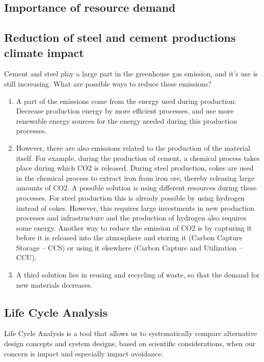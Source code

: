 \documentclass[../summary.tex]{subfiles}
\begin{document}
	\subsection{Importance of resource demand}
	
	
	
	\subsection{Reduction of steel and cement productions climate impact}
	
	Cement and steel play a large part in the greenhouse gas emission, and it’s use is still increasing. What are possible ways to reduce these emissions?
	
	\begin{enumerate}
		\item A part of the emissions come from the energy used during production: Decrease production energy by more efficient processes, and use more renewable energy sources for the energy needed during this production processes. 
		\item However, there are also emissions related to the production of the material itself. For example, during the production of cement, a chemical process takes place during which CO2 is released. During steel production, cokes are used in the chemical process to extract iron from iron ore, thereby releasing large amounts of CO2. A possible solution is using different resources during these processes. For steel production this is already possible by using hydrogen instead of cokes. However, this requires large investments in new production processes and infrastructure and the production of hydrogen also requires some energy. Another way to reduce the emission of CO2 is by capturing it before it is released into the atmosphere and storing it (Carbon Capture Storage – CCS) or using it elsewhere (Carbon Capture and Utilization – CCU). 
		\item A third solution lies in reusing and recycling of waste, so that the demand for new materials decreases. 
	
	\end{enumerate}
	
	\subsection{Life Cycle Analysis}
	
	Life Cycle Analysis is a tool that allows us to systematically compare alternative design concepts and system designs, based on scientific considerations, when our concern is impact and especially impact avoidance.
	
\end{document}
